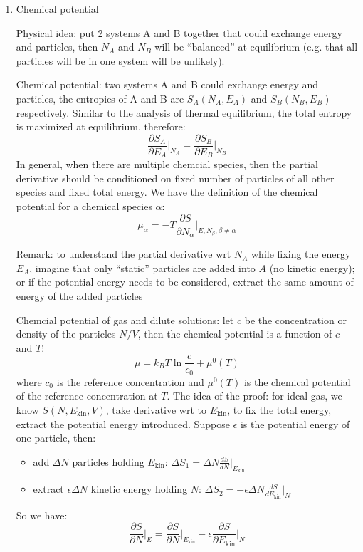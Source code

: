 \documentclass{report}
\begin{document}
\begin{enumerate}

\item{Chemical potential}

Physical idea: put 2 systems A and B together that could exchange energy and particles, then $N_A$ and $N_B$ will be ``balanced'' at equilibrium (e.g. that all particles will be in one system will be unlikely). 

Chemical potential: two systems A and B could exchange energy and particles, the entropies of A and B are $S_A(N_A,E_A)$ and $S_B(N_B,E_B)$ respectively. Similar to the analysis of thermal equilibrium, the total entropy is maximized at equilibrium, therefore: 
\begin{equation}
{\frac{\partial S_A}{\partial E_A}} \bigg \vert_{N_A}= \frac{\partial S_B}{\partial E_B} \bigg \vert_{N_B}
\end{equation}
In general, when there are multiple chemcial species, then the partial derivative should be conditioned on fixed number of particles of all other species and fixed total energy. We have the definition of the chemical potential for a chemical species $\alpha$: 
\begin{equation}
\mu_{\alpha} = -T \frac{\partial S}{\partial N_{\alpha}} \bigg \vert_{E,N_{\beta},\beta \neq \alpha}
\end{equation}

Remark: to understand the partial derivative wrt $N_A$ while fixing the energy $E_A$, imagine that only ``static'' particles are added into $A$ (no kinetic energy); or if the potential energy needs to be considered, extract the same amount of energy of the added particles

Chemcial potential of gas and dilute solutions: let $c$ be the concentration or density of the particles $N/V$, then the chemical potential is a function of $c$ and $T$: 
\begin{equation}
\mu = k_B T \ln \frac{c}{c_0} + \mu^0(T)
\end{equation}
where $c_0$ is the reference concentration and $\mu^0(T)$ is the chemical potential of the reference concentration at $T$. The idea of the proof: for ideal gas, we know $S(N,E_{\text{kin}},V)$, take derivative wrt to $E_{\text{kin}}$, to fix the total energy, extract the potential energy introduced. Suppose $\epsilon$ is the potential energy of one particle, then: 
\begin{itemize}
\item{}add $\Delta N$ particles holding $E_{\text{kin}}$: $\Delta S_1 = \Delta N \frac{dS}{dN}  \vert_{E_{\text{kin}}}$
\item{}extract $\epsilon \Delta N$ kinetic energy holding $N$: $\Delta S_2 = -\epsilon \Delta N \frac{dS}{dE_{\text{kin}}} \vert_{N}$ 
\end{itemize}
So we have: 
\begin{equation}
\frac{\partial S}{\partial N} \bigg \vert_E = \frac{\partial S}{\partial N} \bigg \vert_{E_{\text{kin}}} - \epsilon \frac{\partial S}{\partial E_{\text{kin}}} \bigg \vert_N
\end{equation}


\end{enumerate}
\end{document}
